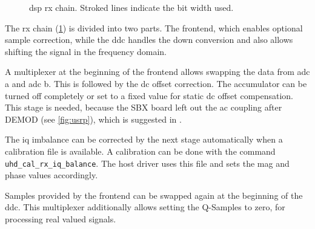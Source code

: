 \documentclass[12pt,a4paper,parskip=full,abstracton]{scrartcl}
\begin{document}
\begin{figure}[htb]
{}
    \caption[\gls{dsp} \gls{rx} chain.]{\gls{dsp} \gls{rx} chain. Stroked lines indicate the bit width used.}
    \label{fig:rxpath}
\end{figure}
The \gls{rx} chain (\cref{fig:rxpath}) is divided into two parts. The frontend, 
which enables optional sample correction, while the \gls{ddc} handles the down
conversion and also allows shifting the signal in the frequency domain.

A multiplexer at the beginning of the frontend allows swapping the data from
\gls{adc} a and \gls{adc} b. This is followed by the \gls{dc} offset correction.
The accumulator can be turned off completely or set to a fixed value for static
\gls{dc} offset compensation. This stage is needed, because the SBX board left
out the \gls{ac} coupling after DEMOD (see \cref{fig:usrp}), which is suggested
in \cite{demod}.

The \gls{iq} imbalance can be corrected by the next stage automatically
when a calibration file is available. A calibration can be done with the command
\verb+uhd_cal_rx_iq_balance+\cite{usrp_cal}. The host driver uses this
file and sets the mag and phase values accordingly.

Samples provided by the frontend can be swapped again at the beginning of the
\gls{ddc}. This multiplexer additionally allows setting the Q-Samples to zero,
for processing real valued signals.
\end{document}
